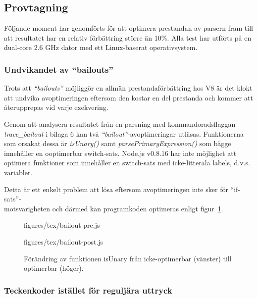 \subsection{Provtagning}

Följande moment har genomförts för att optimera prestandan av parsern fram
till att resultatet har en relativ förbättring större än 10\%. Alla test har
utförts på en dual-core 2.6 GHz dator med ett Linux-baserat operativsystem.

\subsubsection{Undvikandet av ``bailouts''}

Trots att \textit{``bailouts''} möjliggör en allmän prestandaförbättring hos
V8 är det klokt att undvika avoptimeringen eftersom den kostar en del
prestanda och kommer att återupprepas vid varje exekvering.

Genom att analysera resultatet från en parsning med kommandoradsflaggan
\mbox{\textit{-{}-trace_bailout}} i bilaga 6 kan två
\textit{``bailout''}-avoptimeringar utläsas.  Funktionerna som orsakat dessa
är \textit{isUnary()} samt \textit{parsePrimaryExpression()} som bägge
innehåller en ooptimerbar switch-sats. \mbox{Node.js} v0.8.16 har inte
möjlighet att optimera funktioner som innehåller en switch-sats med
icke-litterala labels, d.v.s. variabler.

Detta är ett enkelt problem att lösa eftersom avoptimeringen inte sker för
``if-sats''-\\motsvarigheten och därmed kan programkoden optimeras enligt
figur~\ref{fig:bailout}.

\begin{figure}[ht]
  \begin{minipage}[t]{0.5\textwidth}
      {figures/tex/bailout-pre.js}
  \end{minipage}%
  \begin{minipage}[t]{0.5\textwidth}
      {figures/tex/bailout-post.js}
  \end{minipage}
  \caption{Förändring av funktionen isUnary från icke-optimerbar (vänster) till
    optimerbar (höger).}
  \label{fig:bailout}
\end{figure}

\subsubsection{Teckenkoder istället för reguljära uttryck}

